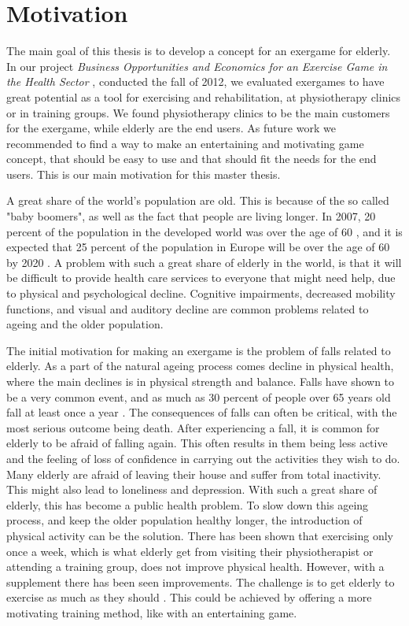 \chapter{Motivation}
\label{chap:background}

The main goal of this thesis is to develop a concept for an exergame for elderly. In our project \emph{Business Opportunities and Economics for an Exercise Game in the Health Sector} \cite{project}, conducted the fall of 2012, we evaluated exergames to have great potential as a tool for exercising and rehabilitation, at physiotherapy clinics or in training groups. We found physiotherapy clinics to be the main customers for the exergame, while elderly are the end users. As future work we recommended to find a way to make an entertaining and motivating game concept, that should be easy to use and that should fit the needs for the end users. This is our main motivation for this master thesis. 

A great share of the world's population are old. This is because of the so called "baby boomers", as well as the fact that people are living longer. In 2007, 20 percent of the population in the developed world was over the age of 60 \cite{dickinson2007methods}, and it is expected that 25 percent of the population in Europe will be over the age of 60 by 2020 \cite{ijsselsteijn2007digital}. A problem with such a great share of elderly in the world, is that it will be difficult to provide health care services to everyone that might need help, due to physical and psychological decline. Cognitive impairments, decreased mobility functions, and visual and auditory decline are common problems related to ageing and the older population.

The initial motivation for making an exergame is the problem of falls related to elderly. As a part of the natural ageing process comes decline in physical health, where the main declines is in physical strength and balance. Falls have shown to be a very common event, and as much as 30 percent of people over 65 years old fall at least once a year \cite{otago}. The consequences of falls can often be critical, with the most serious outcome being death. After experiencing a fall, it is common for elderly to be afraid of falling again. This often results in them being less active and the feeling of loss of confidence in carrying out the activities they wish to do. Many elderly are afraid of leaving their house and suffer from total inactivity. This might also lead to loneliness and depression. With such a great share of elderly, this has become a public health problem. To slow down this ageing process, and keep the older population healthy longer, the introduction of physical activity can be the solution. There has been shown that exercising only once a week, which is what elderly get from visiting their physiotherapist or attending a training group, does not improve physical health. However, with a supplement there has been seen improvements. The challenge is to get elderly to exercise as much as they should \cite{project}. This could be achieved by offering a more motivating training method, like with an entertaining game.

